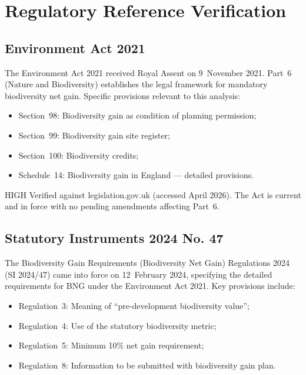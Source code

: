 \section{Regulatory Reference Verification}

\subsection{Environment Act 2021}

The Environment Act 2021 received Royal Assent on 9~November 2021. Part~6 (Nature and Biodiversity) establishes the legal framework for mandatory biodiversity net gain. Specific provisions relevant to this analysis:

\begin{itemize}[nosep]
  \item Section~98: Biodiversity gain as condition of planning permission;
  \item Section~99: Biodiversity gain site register;
  \item Section~100: Biodiversity credits;
  \item Schedule~14: Biodiversity gain in England — detailed provisions.
\end{itemize}

\begin{confidencebox}{HIGH}
Verified against legislation.gov.uk (accessed April 2026). The Act is current and in force with no pending amendments affecting Part~6.
\end{confidencebox}

\subsection{Statutory Instruments 2024 No. 47}

The Biodiversity Gain Requirements (Biodiversity Net Gain) Regulations 2024 (SI 2024/47) \citep{si_2024_47} came into force on 12~February 2024, specifying the detailed requirements for BNG under the Environment Act 2021. Key provisions include:

\begin{itemize}[nosep]
  \item Regulation~3: Meaning of ``pre-development biodiversity value'';
  \item Regulation~4: Use of the statutory biodiversity metric;
  \item Regulation~5: Minimum 10\% net gain requirement;
  \item Regulation~8: Information to be submitted with biodiversity gain plan.
\end{itemize}

